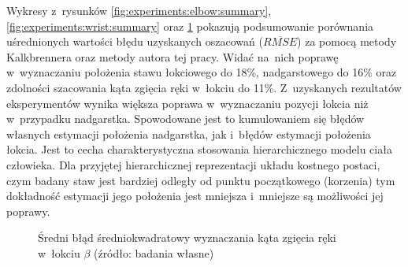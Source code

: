 Wykresy z~rysunków \ref{fig:experiments:elbow:summary}, \ref{fig:experiments:wrist:summary} oraz \ref{fig:experiments:angle:summary} pokazują podsumowanie porównania uśrednionych wartości błędu uzyskanych oszacowań ($\overline{RMSE}$) za pomocą metody Kalkbrennera oraz metody autora tej pracy.
Widać na~nich poprawę w~wyznaczaniu położenia stawu łokciowego do 18\%, nadgarstowego do 16\% oraz zdolności szacowania kąta zgięcia ręki w~łokciu do 11\%. Z~uzyskanych rezultatów eksperymentów wynika większa poprawa w~wyznaczaniu pozycji łokcia niż w~przypadku nadgarstka. Spowodowane jest to kumulowaniem się błędów własnych estymacji położenia nadgarstka, jak i~błędów estymacji położenia łokcia. Jest to cecha charakterystyczna stosowania hierarchicznego modelu ciała człowieka. Dla przyjętej hierarchicznej reprezentacji układu kostnego postaci, czym badany staw jest bardziej odległy od punktu początkowego (korzenia) tym dokładność estymacji jego położenia jest mniejsza i~mniejsze są możliwości jej poprawy.

\begin{figure}[!htb]
	\centering
	\caption{Średni błąd średniokwadratowy wyznaczania kąta zgięcia ręki w~łokciu $\beta$ (źródło: badania własne)}
	\label{fig:experiments:angle:summary}
\end{figure}


